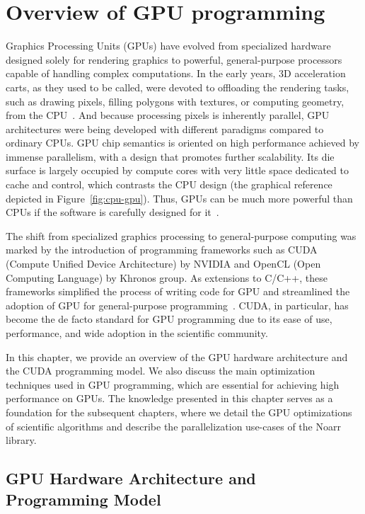 \chapter{Overview of GPU programming}
\label{chap:gpu_intro}


Graphics Processing Units (GPUs) have evolved from specialized hardware designed solely for rendering graphics to powerful, general-purpose processors capable of handling complex computations. In the early years, 3D acceleration carts, as they used to be called, were devoted to offloading the rendering tasks, such as drawing pixels, filling polygons with textures, or computing geometry, from the CPU~\cite{pratx2011gpu}. And because processing pixels is inherently parallel, GPU architectures were being developed with different paradigms compared to ordinary CPUs. GPU chip semantics is oriented on high performance achieved by immense parallelism, with a design that promotes further scalability. Its die surface is largely occupied by compute cores with very little space dedicated to cache and control, which contrasts the CPU design (the graphical reference depicted in Figure~\ref{fig:cpu-gpu}). Thus, GPUs can be much more powerful than CPUs if the software is carefully designed for it~\cite{navarro2014survey}.

The shift from specialized graphics processing to general-purpose computing was marked by the introduction of programming frameworks such as CUDA (Compute Unified Device Architecture) by NVIDIA and OpenCL (Open Computing Language) by Khronos group. As extensions to C/C++, these frameworks simplified the process of writing code for GPU and streamlined the adoption of GPU for general-purpose programming~\cite{croix2009introduction}. CUDA, in particular, has become the de facto standard for GPU programming due to its ease of use, performance, and wide adoption in the scientific community.

In this chapter, we provide an overview of the GPU hardware architecture and the CUDA programming model. We also discuss the main optimization techniques used in GPU programming, which are essential for achieving high performance on GPUs. The knowledge presented in this chapter serves as a foundation for the subsequent chapters, where we detail the GPU optimizations of scientific algorithms and describe the parallelization use-cases of the Noarr library.

\section{GPU Hardware Architecture and Programming Model}
\label{sec:gpu_arch}


